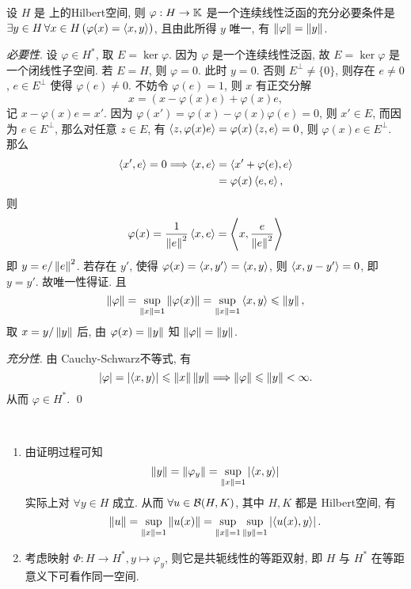 	\begin{Theorem}[Riesz表示定理]
		 设 $ H $ 是 \K 上的Hilbert空间, 则 $ \varphi: H\to \mathbb{K} $ 是一个连续线性泛函的充分必要条件是 $ \exists y\in H\,\forall x\in H\,(\varphi(x)=\left\langle x, y \right\rangle) $, 且由此所得 $ y $ 唯一, 有 $ \left\| \varphi \right\|=\left\| y \right\| $.
	\end{Theorem}

	\begin{Proof}
		\textsl{必要性}. 设 $ \varphi\in H^{*} $, 取 $ E=\ker\varphi $. 因为 $ \varphi $ 是一个连续线性泛函, 故 $ E=\ker\varphi $ 是一个闭线性子空间. 若 $ E=H $, 则 $ \varphi=0 $. 此时 $ y=0 $. 否则 $ E^{\bot}\ne\{0\} $, 则存在 $ e\ne0 $, $ e\in E^{\bot} $ 使得 $ \varphi(e)\ne0 $. 不妨令 $ \varphi(e)=1 $, 则 $ x $ 有正交分解
		\[
			x=(x-\varphi(x)e)+\varphi(x)e,
		\]
		记 $ x-\varphi(x)e=x' $. 因为 $ \varphi(x')=\varphi(x)-\varphi(x)\varphi(e)=0 $, 则 $ x'\in E $, 而因为 $ e\in E^{\bot} $, 那么对任意 $ z\in E $, 有 $ \left\langle z, \varphi(x)e \right\rangle=\varphi(x)\left\langle z, e \right\rangle=0 $, 则 $ \varphi(x)e\in E^{\bot} $. 那么
		\[
			\begin{aligned}
				\left\langle x', e \right\rangle=0\Longrightarrow \left\langle x, e \right\rangle & =\left\langle x'+\varphi(e), e \right\rangle\\
				& =\varphi(x)\left\langle e, e \right\rangle,
			\end{aligned}
		\]
		则
		\[
			\varphi(x)=\frac{1}{\left\| e \right\|^{2}}\left\langle x, e \right\rangle=\left\langle x, \frac{e}{\left\| e \right\|^{2}} \right\rangle
		\]
		即 $ y=e/\left\| e \right\|^{2} $. 若存在 $ y' $, 使得 $ \varphi(x)=\left\langle x, y' \right\rangle=\left\langle x, y \right\rangle $, 则 $ \left\langle x, y-y' \right\rangle=0 $, 即 $ y=y' $. 故唯一性得证. 且
		\[
			\left\| \varphi \right\|=\sup_{\left\| x \right\|=1}\left\| \varphi(x) \right\|=\sup_{\left\| x \right\|=1}\left\langle x, y \right\rangle\leqslant\left\| y \right\|,
		\]
		取 $ x=y/\left\| y \right\| $ 后, 由 $ \varphi(x)=\left\| y \right\| $ 知 $ \left\| \varphi \right\|=\left\| y \right\| $.

		\textsl{充分性}. 由 Cauchy-Schwarz不等式, 有
		\[
			\left| \varphi \right| =\left| \left\langle x, y \right\rangle \right| \leqslant\left\| x \right\|\left\| y \right\| \Longrightarrow \left\| \varphi \right\|\leqslant\left\| y \right\|<\infty.
		\]
		从而 $  \varphi\in H^{*} $. \qed
	\end{Proof}

	\begin{Remark}~
		\begin{enumerate}[(1)]
			\item 由证明过程可知
			\[
				\left\| y \right\|=\left\| \varphi_{y} \right\|=\sup_{\left\| x \right\|=1}\left| \left\langle x, y \right\rangle \right| 
			\]
			实际上对 $ \forall y\in H $ 成立. 从而 $ \forall u\in \mathcal{B}(H, K) $, 其中 $ H, K $ 都是 Hilbert空间, 有
			\[
				\left\| u \right\|=\sup_{\left\| x \right\|=1}\left\| u(x) \right\|=\sup_{\left\| x \right\|=1}\sup_{\left\| y \right\|=1}\left| \left\langle u(x), y \right\rangle \right| .
			\]
			\item 考虑映射 $ \varPhi: H\to H^{*}, y\mapsto \varphi_{y} $, 则它是共轭线性的等距双射, 即 $ H $ 与 $ H^{*} $ 在等距意义下可看作同一空间.
		\end{enumerate}
	\end{Remark}

